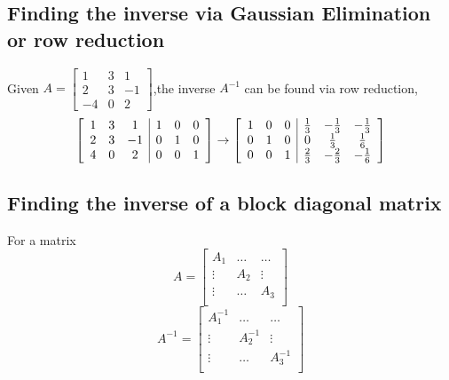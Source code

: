 \subsection{Finding the inverse via Gaussian Elimination or row reduction}

\begin{framed}
   Given $A = \begin{bmatrix} 1 & 3 & 1 \\ 2 & 3 & -1 \\ -4 & 0 & 2 \end{bmatrix} $,the inverse $A^{-1}$ can be found via row reduction, \[
   \left[  
      \begin{array}{c c c | c c c }
         1 & 3 & 1 & 1 & 0 & 0 \\
         2 & 3 & -1 & 0 & 1 & 0 \\
         4 & 0 & 2 & 0 & 0 & 1 \\
      \end{array} \right]
      \rightarrow 
      \left[
      \begin{array}{c c c | c c c }
         1 & 0 & 0 & \frac{1}{3} & -\frac{1}{3} & - \frac{1}{3} \\
         0 & 1 & 0 & 0 & \frac{1}{3} & \frac{1}{6} \\
         0 & 0 & 1 & \frac{2}{3} & -\frac{2}{3} & - \frac{1}{6} \\
      \end{array}
   \right] 
   \] 

  
\end{framed}

\subsection{Finding the inverse of a block diagonal matrix}

\begin{framed}
   For a matrix  \[
     A = \begin{bmatrix} 
        A_1 & \hdots & \hdots \\
        \vdots & A_2 & \vdots \\
        \vdots & \hdots & A_3 \\
     \end{bmatrix}
   \] 
   \[
      A^{-1} = \begin{bmatrix} 
        A_1^{-1} & \hdots & \hdots \\
        \vdots & A^{-1}_2 & \vdots \\
        \vdots & \hdots & A^{-1}_3 \\
     \end{bmatrix}
   \] 
\end{framed}





